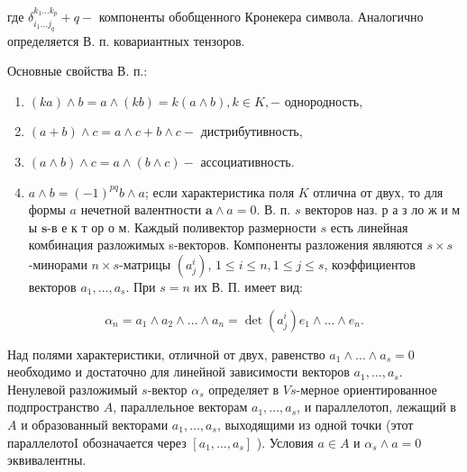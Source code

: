 \documentclass[10pt]{article}
\begin{document}
где $\delta_{i_{1} \ldots j_{q}}^{k_{1} \ldots k_{p}}+q-$ компоненты обобщенного Кронекера символа. Аналогично определяется В. п. ковариантных тензоров.



Основные свойства В. п.:



\begin{enumerate}

  \item $(k a) \wedge b=a \wedge(k b)=k(a \wedge b), k \in K,-$ однородность,



  \item $(a+b) \wedge c=a \wedge c+b \wedge c-$ дистрибутивность,



  \item $(a \wedge b) \wedge c=a \wedge(b \wedge c)-$ ассоциативность.



  \item $a \wedge b=(-1)^{p q} b \wedge a$; если характеристика поля $K$ отлична от двух, то для формы $a$ нечетной валентности $\boldsymbol{a} \wedge a=0$. В. п. $s$ векторов наз. р а з ло ж и м ы $\boldsymbol{s}$-в е к т ор о м. Каждый поливектор размерности $s$ есть линейная комбинация разложимых s-векторов. Компоненты разложения являются $s \times s$-минорами $n \times s$-матрицы $\left(a_{j}^{i}\right)$, $1 \leqslant i \leqslant n, 1 \leqslant j \leqslant s$, коэффициентов векторов $a_{1}, \ldots, a_{s}$. При $s=n$ их В. П. имеет вид:



\end{enumerate}



\[

\alpha_{n}=a_{1} \wedge a_{2} \wedge \ldots \wedge a_{n}=\operatorname{det}\left(a_{j}^{i}\right) e_{1} \wedge \ldots \wedge e_{n} .

\]



Над полями характеристики, отличной от двух, равенство $a_{1} \wedge \ldots \wedge a_{s}=0$ необходимо и достаточно для линейной зависимости векторов $a_{1}, \ldots, a_{s}$. Ненулевой разложимый $s$-вектор $\alpha_{s}$ определяет в $V s$-мерное ориентированное подпространство $A$, параллельное векторам $a_{1}, \ldots, a_{s}$, и параллелотоп, лежащий в $A$ и образованный векторами $a_{1}, \ldots, a_{s}$, выходящими из одной точки (этот параллелотоI обозначается через $\left[a_{1}, \ldots, a_{s}\right]$ ). Условия $a \in A$ и $\alpha_{s} \wedge a=0$ эквивалентны.
\end{document}
